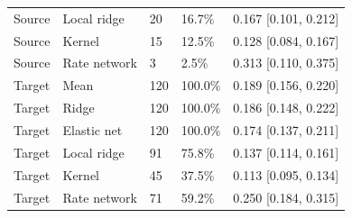\documentclass[a4paper,fleqn]{cas-sc}
\makeatletter
\DeclareRobustCommand{\rev}[1]{{\color{red}\def\@citecolor{black}\def\@linkcolor{red}\def\@urlcolor{red}#1}}
\makeatother
\begin{document}
\begin{longtable}{p{}p{}p{}p{}p{}}
\rev{Source} & \rev{Local ridge} & \rev{20} & \rev{16.7\%} & \rev{0.167 [0.101, 0.212]}\\
\rev{Source} & \rev{Kernel} & \rev{15} & \rev{12.5\%} & \rev{0.128 [0.084, 0.167]}\\
\rev{Source} & \rev{Rate network} & \rev{3} & \rev{2.5\%} & \rev{0.313 [0.110, 0.375]}\\
\rev{Target} & \rev{Mean} & \rev{120} & \rev{100.0\%} & \rev{0.189 [0.156, 0.220]}\\
\rev{Target} & \rev{Ridge} & \rev{120} & \rev{100.0\%} & \rev{0.186 [0.148, 0.222]}\\
\rev{Target} & \rev{Elastic net} & \rev{120} & \rev{100.0\%} & \rev{0.174 [0.137, 0.211]}\\
\rev{Target} & \rev{Local ridge} & \rev{91} & \rev{75.8\%} & \rev{0.137 [0.114, 0.161]}\\
\rev{Target} & \rev{Kernel} & \rev{45} & \rev{37.5\%} & \rev{0.113 [0.095, 0.134]}\\
\rev{Target} & \rev{Rate network} & \rev{71} & \rev{59.2\%} & \rev{0.250 [0.184, 0.315]}\\
\bottomrule
\end{longtable}\normalsize
\end{document}
